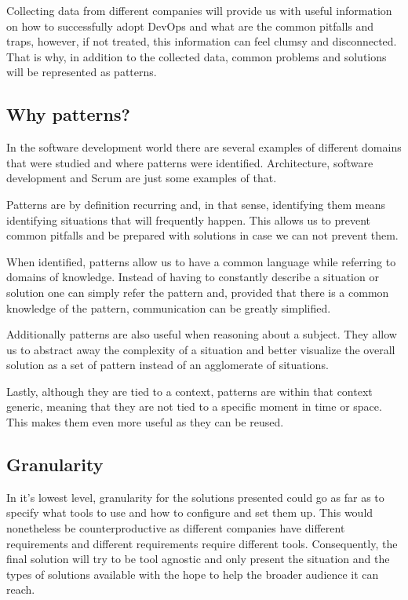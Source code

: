 		Collecting data from different companies will provide us with useful information on how to successfully adopt DevOps and what are the common pitfalls and traps, however, if not treated, this information can feel clumsy and disconnected. That is why, in addition to the collected data, common problems and solutions will be represented as patterns.  
    
    		\subsection{Why patterns?}
      		In the software development world there are several examples of different domains that were studied and where patterns were identified. Architecture, software development and Scrum are just some examples of that.
      
    		Patterns are by definition recurring and, in that sense, identifying them means identifying situations that will frequently happen. This allows us to prevent common pitfalls and be prepared with solutions in case we can not prevent them.
    
   	 		When identified, patterns allow us to have a common language while referring to domains of knowledge. Instead of having to constantly describe a situation or solution one can simply refer the pattern and, provided that there is a common knowledge of the pattern, communication can be greatly simplified.
    
    		Additionally patterns are also useful when reasoning about a subject. They allow us to abstract away the complexity of a situation and better visualize the overall solution as a set of pattern instead of an agglomerate of situations.
    
    		Lastly, although they are tied to a context, patterns are within that context generic, meaning that they are not tied to a specific moment in time or space. This makes them even more useful as they can be reused.
    
    		\subsection{Granularity}
    		In it's lowest level, granularity for the solutions presented could go as far as to specify what tools to use and how to configure and set them up. This would nonetheless be counterproductive as different companies have different requirements and different requirements require different tools. Consequently, the final solution will try to be tool agnostic and only present the situation and the types of solutions available with the hope to help the broader audience it can reach.

